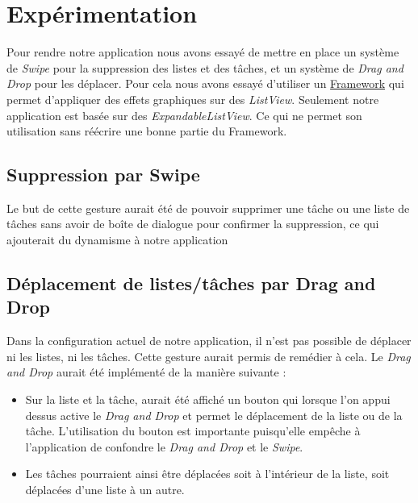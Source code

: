 \documentclass[a4paper,10pt]{article}
\begin{document}
\newpage
\section{Expérimentation}
\label{experimentation}
Pour rendre notre application nous avons essayé de mettre en place un système de \emph{Swipe} pour la suppression des listes et des tâches, et un système de
\emph{Drag and Drop} pour les déplacer. Pour cela nous avons essayé d'utiliser un \href{https://github.com/bauerca/drag-sort-listview}{Framework} qui permet
d'appliquer des effets graphiques sur des \emph{ListView}. Seulement notre application est basée sur des \emph{ExpandableListView}. Ce qui ne permet son
utilisation sans réécrire une bonne partie du Framework.

\subsection{Suppression par Swipe}
Le but de cette gesture aurait été de pouvoir supprimer une tâche ou une liste de tâches sans avoir de boîte de dialogue pour confirmer la suppression, ce qui
ajouterait du dynamisme à notre application

\subsection{Déplacement de listes/tâches par Drag and Drop}
Dans la configuration actuel de notre application, il n'est pas possible de déplacer ni les listes, ni les tâches. Cette gesture aurait permis de remédier à
cela. Le \emph{Drag and Drop} aurait été implémenté de la manière suivante :
\begin{itemize}
	\item Sur la liste et la tâche, aurait été affiché un bouton qui lorsque l'on appui dessus active le \emph{Drag and Drop} et permet le déplacement de la
liste ou de la tâche. L'utilisation du bouton est importante puisqu'elle empêche à l'application de confondre le \emph{Drag and Drop} et le \emph{Swipe}.
	\item Les tâches pourraient ainsi être déplacées soit à l'intérieur de la liste, soit déplacées d'une liste à un autre.
\end{itemize}



\newpage
\end{document}
